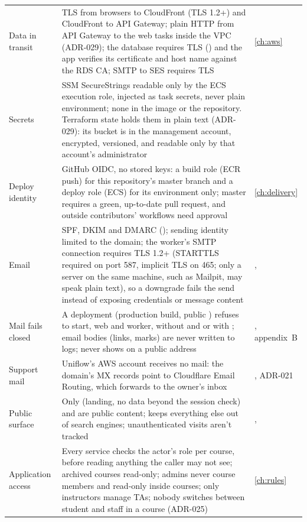 \begin{xltabular}{\linewidth}{@{}P{30mm} L P{26mm}@{}}
  Data in transit & TLS from browsers to CloudFront (TLS 1.2+) and CloudFront to API Gateway; plain HTTP from API Gateway to the web tasks inside the VPC (ADR-029); the database requires TLS () and the app verifies its certificate and host name against the RDS CA; SMTP to SES requires TLS & \cref{ch:aws}\\
  Secrets & SSM SecureStrings readable only by the ECS execution role, injected as task secrets, never plain environment; none in the image or the repository. Terraform state holds them in plain text (ADR-029): its bucket is in the management account, encrypted, versioned, and readable only by that account's administrator & \\
  Deploy identity & GitHub OIDC, no stored keys: a build role (ECR push) for this repository's master branch and a deploy role (ECS) for its  environment only; master requires a green, up-to-date pull request, and outside contributors' workflows need approval & \cref{ch:delivery}\\
  Email & SPF, DKIM and DMARC (); sending identity limited to the domain; the worker's SMTP connection requires TLS 1.2+ (STARTTLS required on port 587, implicit TLS on 465; only a server on the same machine, such as Mailpit, may speak plain text), so a downgrade fails the send instead of exposing credentials or message content & , \\
  Mail fails closed & A deployment (production build, public ) refuses to start, web and worker, without  and  or with ; email bodies (links, marks) are never written to logs;  never shows on a public address & , appendix~B\\
  Support mail & Uniflow's AWS account receives no mail: the domain's MX records point to Cloudflare Email Routing, which forwards  to the owner's inbox & , ADR-021\\
  Public surface & Only \route{/} (landing, no data beyond the session check) and  are public content;  keeps everything else out of search engines; unauthenticated visits aren't tracked & , \\
  Application access & Every service checks the actor's role per course, before reading anything the caller may not see; archived courses read-only; admins never course members and read-only inside courses; only instructors manage TAs; nobody switches between student and staff in a course (ADR-025) & \cref{ch:rules}\\

\end{xltabular}
